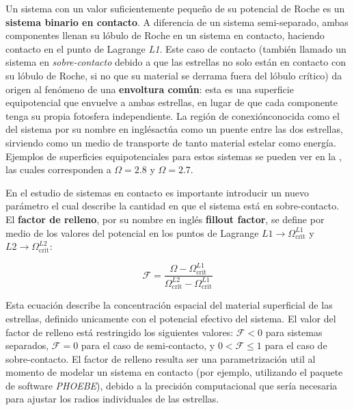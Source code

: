 Un sistema con un valor suficientemente pequeño de su potencial de Roche es un
\textbf{sistema binario en contacto}. A diferencia de un sistema semi-separado,
ambas componentes llenan su lóbulo de Roche en un sistema en contacto, haciendo
contacto en el punto de Lagrange \textit{L1}. Este caso de contacto (también
llamado un sistema en \textit{sobre-contacto} debido a que las estrellas no solo
están en contacto con su lóbulo de Roche, si no que su material se derrama fuera
del lóbulo crítico) da origen al fenómeno de una \textbf{envoltura común}: esta
es una superficie equipotencial que envuelve a ambas estrellas, en lugar de que
cada componente tenga su propia fotosfera independiente. La región de
conexión\textemdash conocida como el  del sistema por su nombre
en inglés\textemdash actúa como un puente entre las dos estrellas, sirviendo
como un medio de transporte de tanto material estelar como energía. Ejemplos de
superficies equipotenciales para estos sistemas se pueden ver en la
, las cuales corresponden a $\Omega = 2.8$ y
$\Omega = 2.7$.

En el estudio de sistemas en contacto es importante introducir un nuevo
parámetro el cual describe la cantidad en que el sistema está en sobre-contacto.
El \textbf{factor de relleno}, por su nombre en inglés \textbf{fillout factor},
se define por medio de los valores del potencial en los puntos de Lagrange $L1
\rightarrow \Omega^{L1}_{\mathrm{crit}}$ y $L2 \rightarrow
\Omega^{L2}_{\mathrm{crit}}$:

\begin{eqfloat}
	\centering
	\begin{equation}
		\mathcal{F} = \frac{\Omega - \Omega^{L1}_{\textrm{crit}}}{\Omega^{L2}_{\textrm{crit}} - \Omega^{L1}_{\textrm{crit}}}
	\end{equation}
\end{eqfloat}

Esta ecuación describe la concentración espacial del material superficial de las
estrellas, definido unicamente con el potencial efectivo del sistema. El valor
del factor de relleno está restringido los siguientes valores: $\mathcal{F} < 0$
para sistemas separados, $\mathcal{F} = 0$ para el caso de semi-contacto, y $0 <
\mathcal{F} \leq 1$ para el caso de sobre-contacto. El factor de relleno resulta
ser una parametrización util al momento de modelar un sistema en contacto (por
ejemplo, utilizando el paquete de software \textit{PHOEBE}), debido a la
precisión computacional que sería necesaria para ajustar los radios individuales
de las estrellas. 

